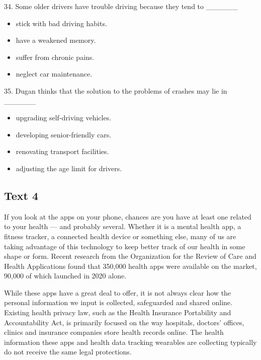 \documentclass[UTF8,11pt]{ctexart}
\begin{document}
34. Some older drivers have trouble driving because they tend to \_\_\_\_\_\_


\begin{itemize}[leftmargin=2em,itemsep=.2em,topsep=.4em]\item[A.] stick with bad driving habits.
\item[B.] have a weakened memory.
\item[C.] suffer from chronic pains.
\item[D.] neglect car maintenance.
\end{itemize}

35. Dugan thinks that the solution to the problems of crashes may lie in \_\_\_\_\_\_


\begin{itemize}[leftmargin=2em,itemsep=.2em,topsep=.4em]\item[A.] upgrading self-driving vehicles.
\item[B.] developing senior-friendly cars.
\item[C.] renovating transport facilities.
\item[D.] adjusting the age limit for drivers.
\end{itemize}

\subsection*{\textbf{Text 4}}


If you look at the apps on your phone, chances are you have at least one related to your health — and probably several. Whether it is a mental health app, a fitness tracker, a connected health device or something else, many of us are taking advantage of this technology to keep better track of our health in some shape or form. Recent research from the Organization for the Review of Care and Health Applications found that 350,000 health apps were available on the market, 90,000 of which launched in 2020 alone.


While these apps have a great deal to offer, it is not always clear how the personal information we input is collected, safeguarded and shared online. Existing health privacy law, such as the Health Insurance Portability and Accountability Act, is primarily focused on the way hospitals, doctors’ offices, clinics and insurance companies store health records online. The health information these apps and health data tracking wearables are collecting typically do not receive the same legal protections.
\end{document}

